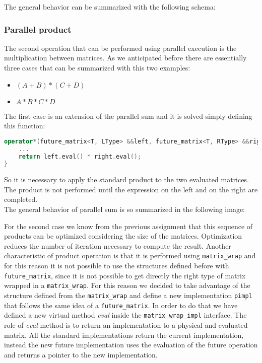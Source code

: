 \documentclass[11pt,a4paper]{article}
\begin{document}
The general behavior can be summarized with the following schema:

\subsubsection{Parallel product}\label{parallel_prod}
The second operation that can be performed using parallel execution is the multiplication between matrices. As we anticipated before there are essentially three cases that can be summarized with this two examples:
\begin{itemize}
	\item $(A+B) * (C+D)$
	\item $A*B*C*D$
\end{itemize}
The first case is an extension of the parallel sum and it is solved simply defining this function:
\begin{lstlisting}[language=C++]
operator*(future_matrix<T, LType> &&left, future_matrix<T, RType> &&right) {
	...
	return left.eval() * right.eval();
}
\end{lstlisting}
So it is necessary to apply the standard product to the two evaluated matrices. The product is not performed until the expression on the left and on the right are completed.\\
The general behavior of parallel sum is so summarized in the following image:

For the second case we know from the previous assignment that this sequence of products can be optimized considering the size of the matrices. Optimization reduces the number of iteration necessary to compute the result. Another characteristic of product operation is that it is performed using \verb|matrix_wrap| and for this reason it is not possible to use the structures defined before with \verb|future_matrix|, since it is not possible to get directly the right type of matrix wrapped in a \verb|matrix_wrap|. For this reason we decided to take advantage of the structure defined from the \verb|matrix_wrap| and define a new implementation \verb|pimpl| that follows the same idea of a \verb|future_matrix|. In order to do that we have defined a new virtual method \textit{eval} inside the \verb|matrix_wrap_impl| interface. The role of \textit{eval} method is to return an implementation to a physical and evaluated matrix. All the standard implementations return the current implementation, instead the new future implementation uses the evaluation of the future operation and returns a pointer to the new implementation.
\end{document}
